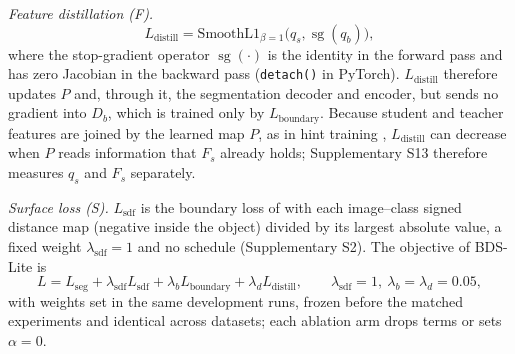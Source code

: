 \documentclass[fleqn,10pt,lineno]{wlpeerj}
\newcommand{\sg}{\operatorname{sg}}
\begin{document}
\emph{Feature distillation (F).}
\begin{equation}
L_{\mathrm{distill}}=\mathrm{SmoothL1}_{\beta=1}\bigl(q_s,\sg(q_b)\bigr),
\end{equation}
where the stop-gradient operator $\sg(\cdot)$ is the identity in the forward pass and has zero Jacobian in the backward pass (\texttt{detach()} in PyTorch). $L_{\mathrm{distill}}$ therefore updates $P$ and, through it, the segmentation decoder and encoder, but sends no gradient into $D_b$, which is trained only by $L_{\mathrm{boundary}}$. Because student and teacher features are joined by the learned map $P$, as in hint training \citep{Romero2015FitNets}, $L_{\mathrm{distill}}$ can decrease when $P$ reads information that $F_s$ already holds; Supplementary S13 therefore measures $q_s$ and $F_s$ separately.

\emph{Surface loss (S).} $L_{\mathrm{sdf}}$ is the boundary loss of \citet{Kervadec2019Boundary} with each image--class signed distance map (negative inside the object) divided by its largest absolute value, a fixed weight $\lambda_{\mathrm{sdf}}=1$ and no schedule (Supplementary S2). The objective of BDS-Lite is
\begin{equation}
L=L_{\mathrm{seg}}+\lambda_{\mathrm{sdf}}L_{\mathrm{sdf}}+\lambda_bL_{\mathrm{boundary}}+\lambda_dL_{\mathrm{distill}},\qquad \lambda_{\mathrm{sdf}}=1,\ \lambda_b=\lambda_d=0.05,
\label{eq:bds}
\end{equation}
with weights set in the same development runs, frozen before the matched experiments and identical across datasets; each ablation arm drops terms or sets $\alpha=0$.
\end{document}
